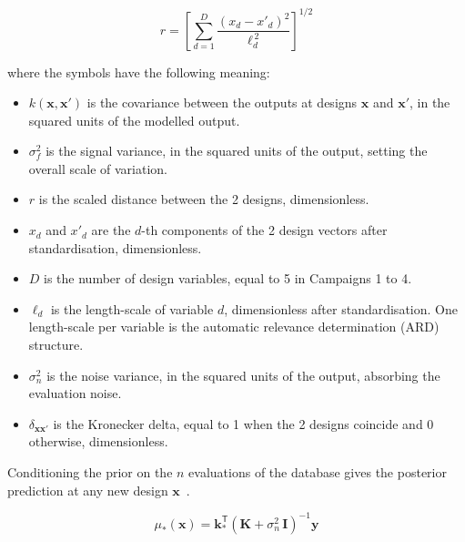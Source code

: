 \begin{equation}
r = \left[ \sum_{d=1}^{D}
\frac{(x_d - x'_d)^{2}}{\ell_d^{\,2}} \right]^{1/2}
\label{eq:kernel-r}
\end{equation}

\noindent where the symbols have the following meaning:

\begin{itemize}
  \item $k(\mathbf{x}, \mathbf{x}')$ is the covariance between the
        outputs at designs $\mathbf{x}$ and $\mathbf{x}'$, in the
        squared units of the modelled output.

  \item $\sigma_f^{2}$ is the signal variance, in the squared units of
        the output, setting the overall scale of variation.

  \item $r$ is the scaled distance between the 2 designs,
        dimensionless.

  \item $x_d$ and $x'_d$ are the $d$-th components of the 2 design
        vectors after standardisation, dimensionless.

  \item $D$ is the number of design variables, equal to 5 in Campaigns
        1 to 4.

  \item $\ell_d$ is the length-scale of variable $d$, dimensionless
        after standardisation. One length-scale per variable is the
        automatic relevance determination (ARD) structure.

  \item $\sigma_n^{2}$ is the noise variance, in the squared units of
        the output, absorbing the evaluation noise.

  \item $\delta_{\mathbf{x}\mathbf{x}'}$ is the Kronecker delta, equal
        to 1 when the 2 designs coincide and 0 otherwise,
        dimensionless.
\end{itemize}

Conditioning the prior on the $n$ evaluations of the database gives the posterior
prediction at any new design $\mathbf{x}$~\cite{rasmussen_gp_2006}.

\begin{equation}
\mu_*(\mathbf{x})
= \mathbf{k}_*^{\mathsf T}
\left( \mathbf{K} + \sigma_n^{2}\,\mathbf{I} \right)^{-1} \mathbf{y}
\label{eq:gp-mean}
\end{equation}

